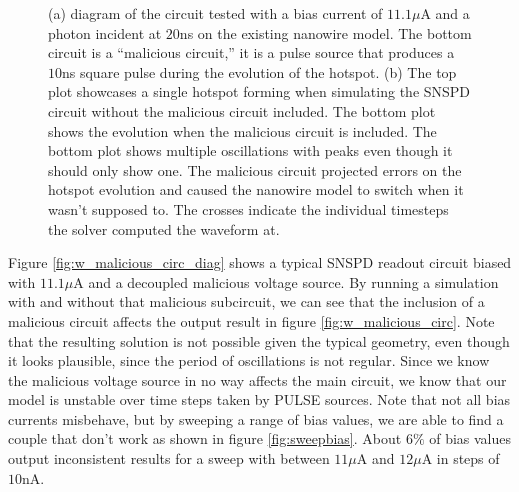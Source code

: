 \begin{figure}
    \centering
    \caption{(a) diagram of the circuit tested with a bias current of $11.1\mu$A and a photon incident at $20$ns on the existing nanowire model. The bottom circuit is a ``malicious circuit,'' it is a pulse source that produces a $10$ns square pulse during the evolution of the hotspot. (b) The top plot showcases a single hotspot forming when simulating
    the SNSPD circuit without the malicious circuit included. The bottom plot shows the evolution when the malicious circuit
    is included. The bottom plot shows multiple oscillations with peaks even though it should only show one. The
    malicious circuit projected errors on the hotspot evolution and caused the nanowire model to switch when it wasn't supposed to. The crosses indicate the individual timesteps the solver computed the waveform at.}
\end{figure}

Figure \ref{fig:w_malicious_circ_diag} shows a typical SNSPD readout circuit biased with $11.1\mu$A
and a decoupled
malicious voltage source. By running a simulation with and without that malicious subcircuit,
we can see that the inclusion of a malicious circuit affects the output result in figure
\ref{fig:w_malicious_circ}. Note that the resulting solution is not possible given the
typical geometry, even though it looks plausible, since the period of oscillations is not 
regular. Since we know the malicious voltage source in no way affects the main circuit,
we know that our model is unstable over time steps taken by PULSE sources. Note that
not all bias currents misbehave, but by sweeping a range of bias values, we are able to
find a couple that don't work as shown in figure \ref{fig:sweepbias}. About $6\%$ of
bias values output inconsistent results for a sweep with between $11\mu$A and $12\mu$A 
in steps of $10$nA.

